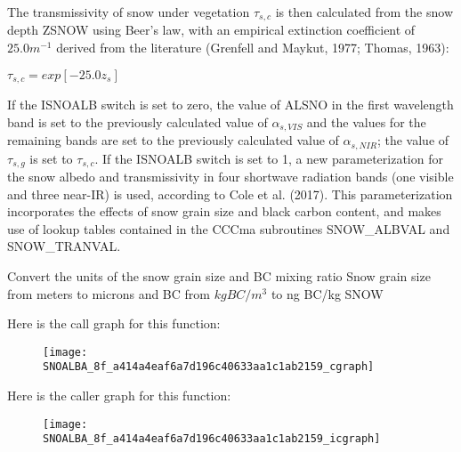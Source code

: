 The transmissivity of snow under vegetation $\tau_{s,c}$ is then calculated from the snow depth Z\+S\+N\+O\+W using Beer’s law, with an empirical extinction coefficient of $25.0 m^{-1}$ derived from the literature (Grenfell and Maykut, 1977; Thomas, 1963)\+:

$\tau_{s,c} = exp[-25.0 z_s]$

If the I\+S\+N\+O\+A\+L\+B switch is set to zero, the value of A\+L\+S\+N\+O in the first wavelength band is set to the previously calculated value of $\alpha_{s,VIS}$ and the values for the remaining bands are set to the previously calculated value of $\alpha_{s,NIR}$; the value of $\tau_{s,g}$ is set to $\tau_{s,c}$. If the I\+S\+N\+O\+A\+L\+B switch is set to 1, a new parameterization for the snow albedo and transmissivity in four shortwave radiation bands (one visible and three near-\/\+I\+R) is used, according to Cole et al. (2017). This parameterization incorporates the effects of snow grain size and black carbon content, and makes use of lookup tables contained in the C\+C\+Cma subroutines S\+N\+O\+W\+\_\+\+A\+L\+B\+V\+A\+L and S\+N\+O\+W\+\_\+\+T\+R\+A\+N\+V\+A\+L.

Convert the units of the snow grain size and B\+C mixing ratio Snow grain size from meters to microns and B\+C from $kg BC/m^3$ to ng B\+C/kg S\+N\+O\+W

Here is the call graph for this function\+:\nopagebreak
\begin{figure}[H]
\begin{center}
\leavevmode
\texttt{[image: SNOALBA\_8f\_a414a4eaf6a7d196c40633aa1c1ab2159\_cgraph]}
\end{center}
\end{figure}




Here is the caller graph for this function\+:\nopagebreak
\begin{figure}[H]
\begin{center}
\leavevmode
\texttt{[image: SNOALBA\_8f\_a414a4eaf6a7d196c40633aa1c1ab2159\_icgraph]}
\end{center}
\end{figure}


